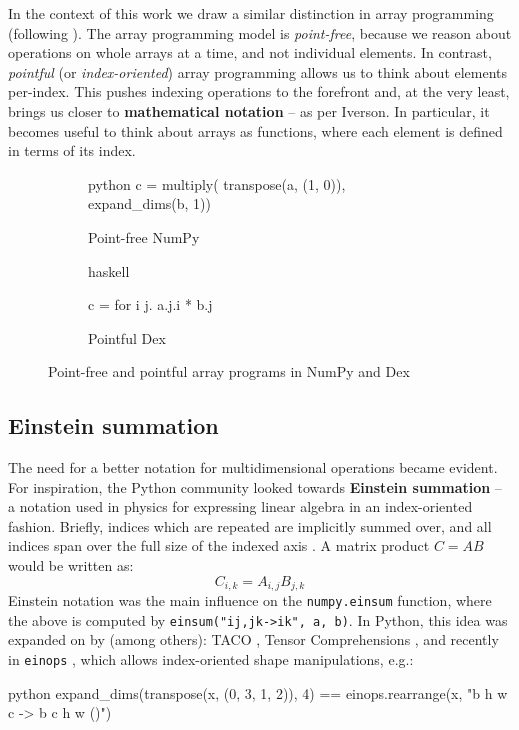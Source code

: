 In the context of this work we draw a similar distinction in array programming (following \textcite{paszke2021getting}).
The array programming model is \textit{point-free}, because we reason about operations on whole arrays at a time, and not individual elements. 
In contrast, \textit{pointful} (or \textit{index-oriented}) array programming allows us to think about elements per-index. 
This pushes indexing operations to the forefront and, at the very least, brings us closer to \textbf{mathematical notation} -- as per Iverson.
In particular, it becomes useful to think about arrays as functions, where each element is defined in terms of its index. 

\begin{figure}[h]
\centering
\begin{subfigure}{.4\textwidth}
  \centering
    \begin{cminted}{python}
c = multiply(
  transpose(a, (1, 0)),
  expand_dims(b, 1))
    \end{cminted}
      \caption{Point-free NumPy}
\end{subfigure}%
\begin{subfigure}{.4\textwidth}
  \centering
  \begin{cminted}{haskell}

c = for i j. a.j.i * b.j
  
  \end{cminted}
  \caption{Pointful Dex}
\end{subfigure}
\caption{Point-free and pointful array programs in NumPy and Dex}
\label{fig:point-arrays}
\end{figure}


\subsection{Einstein summation}

The need for a better notation for multidimensional operations became evident. For inspiration, the Python community looked towards \textbf{Einstein summation} -- a notation used in physics for expressing linear algebra in an index-oriented fashion. Briefly, indices which are repeated are implicitly summed over, and all indices span over the full size of the indexed axis \cite{aahlander2002einstein}. A matrix product $C = AB$ would be written as:
$$ C_{i,k} = A_{i,j} B_{j,k} $$
Einstein notation was the main influence on the \texttt{numpy.einsum} function, where the above is computed by \texttt{einsum("ij,jk->ik", a, b)}. In Python, this idea was expanded on by (among others): TACO \cite{kjolstad2017tensor}, Tensor Comprehensions \cite{vasilache2018tensor}, and recently in \texttt{einops} \cite{rogozhnikov2021einops}, which allows index-oriented shape manipulations, e.g.:
\begin{center}
\begin{cminted}{python}
expand_dims(transpose(x, (0, 3, 1, 2)), 4) == einops.rearrange(x, "b h w c -> b c h w ()")
\end{cminted}
\end{center}


